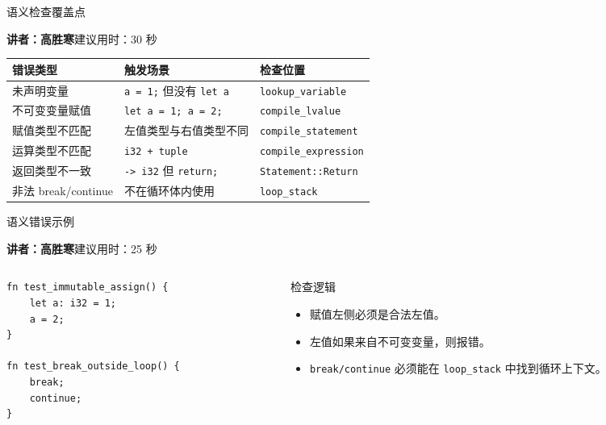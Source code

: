 \documentclass[aspectratio=169]{ctexbeamer}
\newcommand{\speaker}[2]{%
    \vspace{-0.4em}
    \begin{flushright}
        \scriptsize\color{mainblue}\textbf{讲者：#1}\quad 建议用时：#2
    \end{flushright}
    \vspace{-0.7em}
}
\begin{document}
\begin{frame}{语义检查覆盖点}
    \speaker{高胜寒}{30 秒}
    \begin{table}
    \centering
    \small
    \begin{tabular}{p{3.1cm}p{4.3cm}p{4.2cm}}
        \toprule
        \textbf{错误类型} & \textbf{触发场景} & \textbf{检查位置} \\
        \midrule
        未声明变量 & \texttt{a = 1;} 但没有 \texttt{let a} & \texttt{lookup\_variable} \\
        不可变变量赋值 & \texttt{let a = 1; a = 2;} & \texttt{compile\_lvalue} \\
        赋值类型不匹配 & 左值类型与右值类型不同 & \texttt{compile\_statement} \\
        运算类型不匹配 & \texttt{i32 + tuple} & \texttt{compile\_expression} \\
        返回类型不一致 & \texttt{-> i32} 但 \texttt{return;} & \texttt{Statement::Return} \\
        非法 break/continue & 不在循环体内使用 & \texttt{loop\_stack} \\
        \bottomrule
    \end{tabular}
    \end{table}
\end{frame}

\begin{frame}[fragile]{语义错误示例}
    \speaker{高胜寒}{25 秒}
    \begin{columns}[T]
    \begin{column}{0.48\textwidth}
        \begin{lstlisting}[style=tinycode]
fn test_immutable_assign() {
    let a: i32 = 1;
    a = 2;
}

fn test_break_outside_loop() {
    break;
    continue;
}
        \end{lstlisting}
    \end{column}
    \begin{column}{0.48\textwidth}
        \begin{block}{检查逻辑}
            \begin{itemize}
                \item 赋值左侧必须是合法左值。
                \item 左值如果来自不可变变量，则报错。
                \item \texttt{break/continue} 必须能在 \texttt{loop\_stack} 中找到循环上下文。
            \end{itemize}
        \end{block}
    \end{column}
    \end{columns}
\end{frame}
\end{document}
